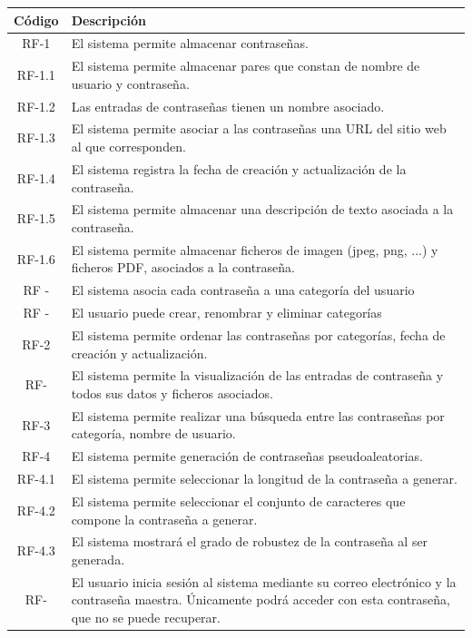 \documentclass{article}
\begin{document}
\begin{table}[H]
    \centering
    \begin{tabular}{| c | p{30em} |}
    \hline
        Código &  Descripción  \\ \hline
        RF-1 & El sistema permite almacenar contraseñas. \\ \hline
        RF-1.1 & El sistema permite almacenar pares que constan de nombre de usuario y contraseña.  \\ \hline
        RF-1.2 & Las entradas de contraseñas tienen un nombre asociado. \\ \hline
        RF-1.3 & El sistema permite asociar a las contraseñas una URL del sitio web al que corresponden. \\ \hline
        RF-1.4 & El sistema registra la fecha de creación y actualización de la contraseña. \\ \hline
        RF-1.5 & El sistema permite almacenar una descripción de texto asociada a la contraseña. \\ \hline
        RF-1.6 & El sistema permite almacenar ficheros de imagen (jpeg, png, ...) y ficheros PDF, asociados a la contraseña. \\ \hline
        RF - & El sistema asocia cada contraseña a una categoría del usuario\\ \hline
        RF - & El usuario puede crear, renombrar y eliminar categorías \\ \hline
        RF-2 & El sistema permite ordenar las contraseñas por categorías, fecha de creación y actualización. \\ \hline
        RF- & El sistema permite la visualización de las entradas de contraseña y todos sus datos y ficheros asociados.\\ \hline
        RF-3 & El sistema permite realizar una búsqueda entre las contraseñas por categoría, nombre de usuario.  \\ \hline
        RF-4 & El sistema permite generación de contraseñas pseudoaleatorias. \\ \hline
        RF-4.1 & El sistema permite seleccionar la longitud de la contraseña a generar.\\ \hline
        RF-4.2 & El sistema permite seleccionar el conjunto de caracteres que compone la contraseña a generar.\\ \hline
        RF-4.3 & El sistema mostrará el grado de robustez de la contraseña al ser generada. \\ \hline
        RF- & El usuario inicia sesión al sistema mediante su correo electrónico y la contraseña maestra. Únicamente podrá acceder con esta contraseña, que no se puede recuperar.\\ \hline

\end{tabular}
\end{table}
\end{document}
